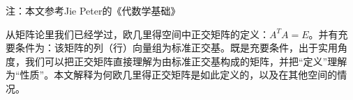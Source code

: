 

\begin{issues}
\issueTODO
\end{issues}

注：本文参考Jie Peter的《代数学基础》

从矩阵论里我们已经学过，欧几里得空间中正交矩阵的定义：$A^T A=E$。并有充要条件为：该矩阵的列（行）向量组为标准正交基。既是充要条件，出于实用角度，我们可以把正交矩阵直接理解为由标准正交基构成的矩阵，并把“定义”理解为“性质”。本文解释为何欧几里得正交矩阵是如此定义的，以及在其他空间的情况。